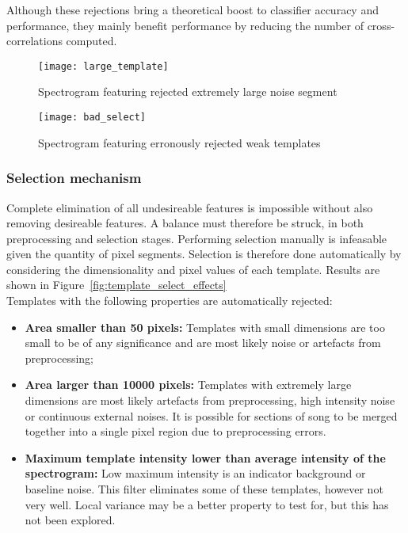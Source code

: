 Although these rejections bring a theoretical boost to classifier accuracy and
performance, they mainly benefit performance by reducing the number of
cross-correlations computed.

\begin{figure}[h]
  \centering
  \texttt{[image: large\_template]}
  \caption{Spectrogram featuring rejected extremely large noise segment}
  \label{fig:bad_select}
\end{figure}

\begin{figure}[h]
  \centering
  \texttt{[image: bad\_select]}
  \caption{Spectrogram featuring erronously rejected weak templates}
  \label{fig:bad_select}
\end{figure}

\subsubsection{Selection mechanism}
Complete elimination of all undesireable features is impossible without also
removing desireable features.
A balance must therefore be struck, in both preprocessing and selection stages.
Performing selection manually is infeasable given the quantity
of pixel segments.
Selection is therefore done automatically by considering the dimensionality and
pixel values of each template.
Results are shown in Figure~\ref{fig:template_select_effects}\\

Templates with the following properties are automatically rejected:
\begin{itemize}[noitemsep]
  \item \textbf{Area smaller than 50 pixels:} Templates with small dimensions
    are too small to be of any significance and are most likely noise or
    artefacts from preprocessing;

  \item \textbf{Area larger than 10000 pixels:} Templates with extremely large
    dimensions are most likely artefacts from preprocessing, high intensity
    noise or continuous external noises.
    It is possible for sections of song to be merged together into a single
    pixel region due to preprocessing errors.

  \item \textbf{Maximum template intensity lower than average intensity of the
    spectrogram:}
    Low maximum intensity is an indicator background or baseline noise.
    This filter eliminates some of these templates, however not very well.
    Local variance may be a better property to test for, but this has not been
    explored.
\end{itemize}

